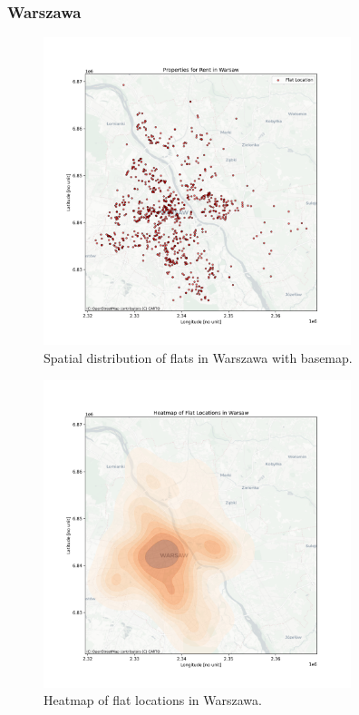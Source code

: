     \subsubsection{Warszawa}
    \begin{figure}[H]
        \centering
        \includegraphics[width=0.8\textwidth]{figures/warsaw_flats_map_with_basemap.png}
        \caption{Spatial distribution of flats in Warszawa with basemap.}
        \label{fig:warsaw_basemap}
    \end{figure}

    \begin{figure}[H]
        \centering
        \includegraphics[width=0.8\textwidth]{figures/warsaw_heatmap.png}
        \caption{Heatmap of flat locations in Warszawa.}
        \label{fig:warsaw_heatmap}
    \end{figure}

